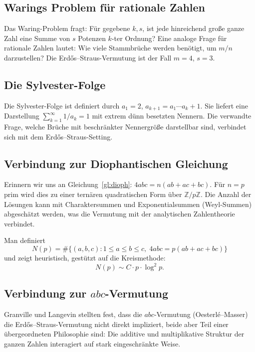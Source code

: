 \documentclass[12pt,a4paper]{amsart}
\theoremstyle{definition}
\newcommand{\Z}{\mathbb{Z}}
\begin{document}
\subsection{Warings Problem für rationale Zahlen}

Das Waring-Problem fragt: Für gegebene $k, s$, ist jede hinreichend große
ganze Zahl eine Summe von $s$ Potenzen $k$-ter Ordnung?  Eine analoge Frage
für rationale Zahlen lautet: Wie viele Stammbrüche werden benötigt,
um $m/n$ darzustellen?  Die Erd\H{o}s--Straus-Vermutung ist der Fall
$m = 4$, $s = 3$.

\subsection{Die Sylvester-Folge}

Die Sylvester-Folge ist definiert durch $a_1 = 2$,
$a_{k+1} = a_1 \cdots a_k + 1$.  Sie liefert eine Darstellung
$\sum_{k=1}^{\infty} 1/a_k = 1$ mit extrem dünn besetzten Nennern.
Die verwandte Frage, welche Brüche mit beschränkter Nennergröße
darstellbar sind, verbindet sich mit dem Erd\H{o}s--Straus-Setting.

\subsection{Verbindung zur Diophantischen Gleichung}

Erinnern wir uns an Gleichung~\eqref{gl:dioph}: $4abc = n(ab+ac+bc)$.
Für $n = p$ prim wird dies zu einer ternären quadratischen Form über
$\Z/p\Z$.  Die Anzahl der Lösungen kann mit Charaktersummen und
Exponentialsummen (Weyl-Summen) abgeschätzt werden, was die Vermutung
mit der analytischen Zahlentheorie verbindet.

Man definiert
\[
  N(p) = \#\{(a,b,c) : 1 \leq a \leq b \leq c,\; 4abc = p(ab+ac+bc)\}
\]
und zeigt heuristisch, gestützt auf die Kreismethode:
\[
  N(p) \sim C \cdot p \cdot \log^2 p.
\]

\subsection{Verbindung zur $abc$-Vermutung}

Granville und Langevin stellten fest, dass die $abc$-Vermutung
(Oesterl\'e--Masser) die Erd\H{o}s--Straus-Vermutung nicht direkt
impliziert, beide aber Teil einer übergeordneten Philosophie sind:
Die additive und multiplikative Struktur der ganzen Zahlen interagiert
auf stark eingeschränkte Weise.
\end{document}

